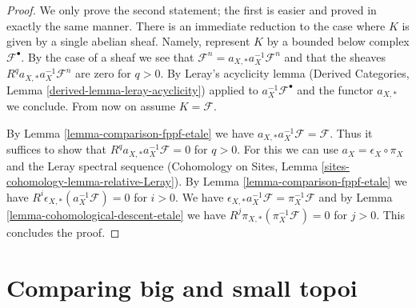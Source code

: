 \documentclass{stacks-project}
\theoremstyle{plain}
\theoremstyle{definition}
\theoremstyle{remark}
\numberwithin{equation}{subsection}
\begin{document}
\begin{proof}
We only prove the second statement; the first is easier and proved in exactly
the same manner.
There is an immediate reduction to the case where
$K$ is given by a single abelian sheaf. Namely, represent $K$
by a bounded below complex $\mathcal{F}^\bullet$. By the case of a
sheaf we see that
$\mathcal{F}^n = a_{X, *} a_X^{-1} \mathcal{F}^n$
and that the sheaves $R^qa_{X, *}a_X^{-1}\mathcal{F}^n$
are zero for $q > 0$. By Leray's acyclicity lemma
(Derived Categories, Lemma \ref{derived-lemma-leray-acyclicity})
applied to $a_X^{-1}\mathcal{F}^\bullet$
and the functor $a_{X, *}$ we conclude. From now on assume $K = \mathcal{F}$.

\medskip\noindent
By Lemma \ref{lemma-comparison-fppf-etale} we have
$a_{X, *}a_X^{-1}\mathcal{F} = \mathcal{F}$. Thus it suffices to show that
$R^qa_{X, *}a_X^{-1}\mathcal{F} = 0$ for $q > 0$.
For this we can use $a_X = \epsilon_X \circ \pi_X$ and
the Leray spectral sequence
(Cohomology on Sites, Lemma \ref{sites-cohomology-lemma-relative-Leray}).
By Lemma \ref{lemma-comparison-fppf-etale}
we have $R^i\epsilon_{X, *}(a_X^{-1}\mathcal{F}) = 0$ for $i > 0$.
We have
$\epsilon_{X, *}a_X^{-1}\mathcal{F} = \pi_X^{-1}\mathcal{F}$
and by Lemma \ref{lemma-cohomological-descent-etale} we have
$R^j\pi_{X, *}(\pi_X^{-1}\mathcal{F}) = 0$ for $j > 0$.
This concludes the proof.
\end{proof}

\section{Comparing big and small topoi}
\label{section-compare}
\end{document}
